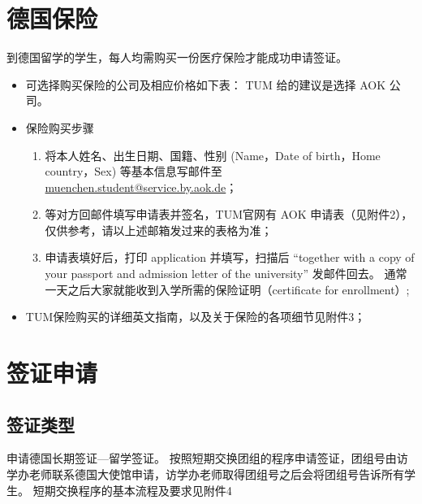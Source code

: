 \documentclass[final]{book}
\begin{document}
\chapter{德国保险}
到德国留学的学生，每人均需购买一份医疗保险才能成功申请签证。%
\begin{itemize}
\item 可选择购买保险的公司及相应价格如下表：%
TUM 给的建议是选择 AOK 公司。
\item 保险购买步骤
\begin{enumerate}
\item 将本人姓名、出生日期、国籍、性别 (Name，Date of birth，Home country，Sex) 等基本信息写邮件至 \sloppy \href{mailto:muenchen.student@service.by.aok.de}{muenchen.student@service.by.aok.de}；%
\item 等对方回邮件填写申请表并签名，TUM官网有 AOK 申请表（见附件2），仅供参考，请以上述邮箱发过来的表格为准；
\item 申请表填好后，打印 application 并填写，扫描后 ``together with a copy of your passport and admission letter of the university'' 发邮件回去。%
通常一天之后大家就能收到入学所需的保险证明（certificate for enrollment）;
\end{enumerate}
\item TUM保险购买的详细英文指南，以及关于保险的各项细节见附件3；
\end{itemize}

\chapter{签证申请}
\section{签证类型}
申请德国长期签证---留学签证。 
按照短期交换团组的程序申请签证，团组号由访学办老师联系德国大使馆申请，访学办老师取得团组号之后会将团组号告诉所有学生。
短期交换程序的基本流程及要求见附件4
\end{document}
